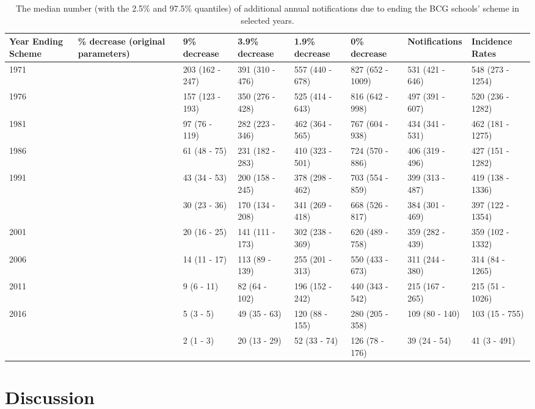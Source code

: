 \documentclass[11pt,twoside]{bristolthesis}
\begin{document}
  \begin{landscape}\begin{table}[!h]
  
  \caption{\label{tab:annual-prevent-tab}The median number (with the 2.5\% and 97.5\% quantiles) of additional annual notifications due to ending the BCG schools' scheme in selected years.}
  \centering
  \fontsize{8}{10}\selectfont
  \begin{tabular}{l>{\raggedright\arraybackslash}p{2cm}llllll}
  \toprule
  Year Ending Scheme & 9\% decrease (original parameters) & 9\% decrease & 3.9\% decrease & 1.9\% decrease & 0\% decrease & Notifications & Incidence Rates\\
  \midrule
  1971 & 204 & 203 (162 - 247) & 391 (310 - 476) & 557 (440 - 678) & 827 (652 - 1009) & 531 (421 - 646) & 548 (273 - 1254)\\
  1976 & 158 & 157 (123 - 193) & 350 (276 - 428) & 525 (414 - 643) & 816 (642 - 998) & 497 (391 - 607) & 520 (236 - 1282)\\
  1981 & 97 & 97 (76 - 119) & 282 (223 - 346) & 462 (364 - 565) & 767 (604 - 938) & 434 (341 - 531) & 462 (181 - 1275)\\
  1986 & 61 & 61 (48 - 75) & 231 (182 - 283) & 410 (323 - 501) & 724 (570 - 886) & 406 (319 - 496) & 427 (151 - 1282)\\
  1991 & 43 & 43 (34 - 53) & 200 (158 - 245) & 378 (298 - 462) & 703 (554 - 859) & 399 (313 - 487) & 419 (138 - 1336)\\
  \addlinespace
  1996 & 30 & 30 (23 - 36) & 170 (134 - 208) & 341 (269 - 418) & 668 (526 - 817) & 384 (301 - 469) & 397 (122 - 1354)\\
  2001 & 20 & 20 (16 - 25) & 141 (111 - 173) & 302 (238 - 369) & 620 (489 - 758) & 359 (282 - 439) & 359 (102 - 1332)\\
  2006 & 14 & 14 (11 - 17) & 113 (89 - 139) & 255 (201 - 313) & 550 (433 - 673) & 311 (244 - 380) & 314 (84 - 1265)\\
  2011 & 9 & 9 (6 - 11) & 82 (64 - 102) & 196 (152 - 242) & 440 (343 - 542) & 215 (167 - 265) & 215 (51 - 1026)\\
  2016 & 5 & 5 (3 - 5) & 49 (35 - 63) & 120 (88 - 155) & 280 (205 - 358) & 109 (80 - 140) & 103 (15 - 755)\\
  \addlinespace
  2021 & 2 & 2 (1 - 3) & 20 (13 - 29) & 52 (33 - 74) & 126 (78 - 176) & 39 (24 - 54) & 41 (3 - 491)\\
  \bottomrule
  \end{tabular}
  \end{table}
  \end{landscape}
  \hypertarget{discussion-1}{%
  \chapter{Discussion}\label{discussion-1}}
  
\end{document}
